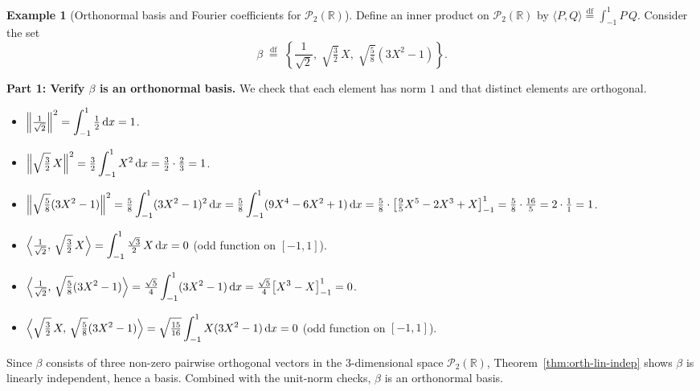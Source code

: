 \documentclass[11pt, a4paper, notitlepage]{report}
\theoremstyle{definition}
\newtheorem{example}[theorem]{Example}
\theoremstyle{remark}
\begin{document}
\begin{example}[Orthonormal basis and Fourier coefficients for $\mathscr{P}_2(\mathbb{R})$]
\label{ex:fourier-P2}
Define an inner product on $\mathscr{P}_2(\mathbb{R})$ by
$\langle P,Q\rangle \stackrel{\mathrm{df}}{=} \int_{-1}^{1} P\,Q$.
Consider the set
\[
  \beta \;\stackrel{\mathrm{df}}{=}\;
  \left\{\frac{1}{\sqrt{2}},\;\sqrt{\tfrac{3}{2}}\,X,\;\sqrt{\tfrac{5}{8}}(3X^2-1)\right\}.
\]

\medskip
\textbf{Part 1: Verify $\beta$ is an orthonormal basis.}
We check that each element has norm $1$ and that distinct elements are orthogonal.
\begin{itemize}
  \item $\displaystyle\Bigl\|\tfrac{1}{\sqrt{2}}\Bigr\|^2 = \int_{-1}^1\tfrac{1}{2}\,\mathrm{d}x = 1$. \checkmark
  \item $\displaystyle\Bigl\|\sqrt{\tfrac{3}{2}}\,X\Bigr\|^2 = \tfrac{3}{2}\int_{-1}^1 X^2\,\mathrm{d}x
        = \tfrac{3}{2}\cdot\tfrac{2}{3} = 1$. \checkmark
  \item $\displaystyle\Bigl\|\sqrt{\tfrac{5}{8}}(3X^2-1)\Bigr\|^2
        = \tfrac{5}{8}\int_{-1}^1(3X^2-1)^2\,\mathrm{d}x
        = \tfrac{5}{8}\int_{-1}^1(9X^4-6X^2+1)\,\mathrm{d}x
        = \tfrac{5}{8}\cdot\bigl[\tfrac{9}{5}X^5-2X^3+X\bigr]_{-1}^{1}
        = \tfrac{5}{8}\cdot\tfrac{16}{5} = 2\cdot\tfrac{1}{1} = 1$. \checkmark
  \item $\displaystyle\Bigl\langle\tfrac{1}{\sqrt{2}},\,\sqrt{\tfrac{3}{2}}\,X\Bigr\rangle
        = \int_{-1}^1\tfrac{\sqrt{3}}{2}\,X\,\mathrm{d}x = 0$
        (odd function on $[-1,1]$). \checkmark
  \item $\displaystyle\Bigl\langle\tfrac{1}{\sqrt{2}},\,\sqrt{\tfrac{5}{8}}(3X^2-1)\Bigr\rangle
        = \tfrac{\sqrt{5}}{4}\int_{-1}^1(3X^2-1)\,\mathrm{d}x
        = \tfrac{\sqrt{5}}{4}\bigl[X^3-X\bigr]_{-1}^{1} = 0$. \checkmark
  \item $\displaystyle\Bigl\langle\sqrt{\tfrac{3}{2}}\,X,\,\sqrt{\tfrac{5}{8}}(3X^2-1)\Bigr\rangle
        = \sqrt{\tfrac{15}{16}}\int_{-1}^1 X(3X^2-1)\,\mathrm{d}x = 0$
        (odd function on $[-1,1]$). \checkmark
\end{itemize}
Since $\beta$ consists of three non-zero pairwise orthogonal vectors in the
$3$-dimensional space $\mathscr{P}_2(\mathbb{R})$, Theorem~\ref{thm:orth-lin-indep}
shows $\beta$ is linearly independent, hence a basis.
Combined with the unit-norm checks, $\beta$ is an orthonormal basis.


\end{example}
\end{document}
